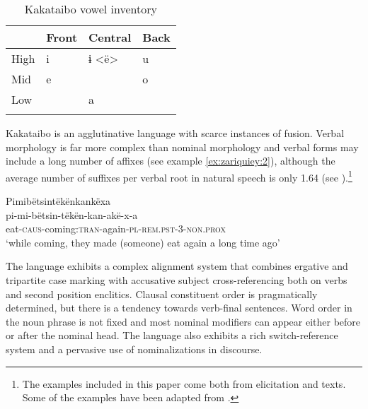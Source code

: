 \documentclass[output=paper,colorlinks,citecolor=brown,modfonts,nonflat]{langscibook}
\begin{document}
\begin{table}
    \caption{Kakataibo vowel inventory}
    \label{tab:zariquiey:2}
    \begin{tabularx}{\textwidth}{XXXX} 
     \lsptoprule
    & {Front} & {Central} & {Back}\\
    \hline
        {High} & i & ɨ <ë> & u\\
        {Mid} & e &  & o\\
        {Low} &  & a & \\
       \lspbottomrule
    \end{tabularx}
\end{table}


Kakataibo is an agglutinative language with scarce instances of fusion. Verbal morphology is far more complex than nominal morphology and verbal forms may include a long number of affixes (see example \ref{ex:zariquiey:2}), although the average number of suffixes per verbal root in natural speech is only 1.64 (see \citealt[150]{Zariquiey2018}).\footnote{The examples included in this paper come both from elicitation and texts. Some of the examples have been adapted from \citet[308]{Zariquiey2018}.}

\ea%
    \label{ex:zariquiey:2}
    \glll   Pimibëtsintëkënkankëxa\\
            pi-mi-bëtsin-tëkën-kan-akë-x-a\\
            eat-\textsc{caus-}coming:\textsc{tran-}again\textsc{-pl-rem.pst-3-non.prox}\\
    \glt    ‘while coming, they made (someone) eat again a long time ago’
\z    

The language exhibits a complex alignment system that combines ergative and tripartite case marking with accusative subject cross-referencing both on verbs and second position enclitics. Clausal constituent order is pragmatically determined, but there is a tendency towards verb-final sentences. Word order in the noun phrase is not fixed and most nominal modifiers can appear either before or after the nominal head. The language also exhibits a rich switch-reference system and a pervasive use of nominalizations in discourse.
\end{document}
